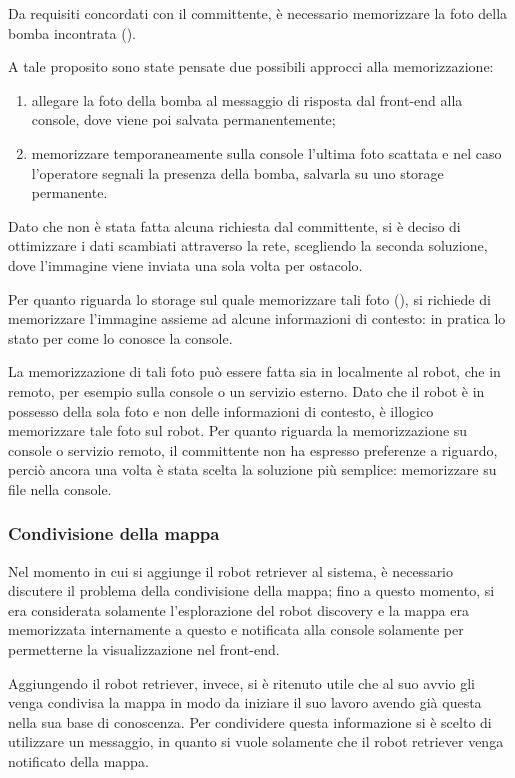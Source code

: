 Da requisiti concordati con il committente, è necessario memorizzare la foto della bomba incontrata ().

A tale proposito sono state pensate due possibili approcci alla memorizzazione:

\begin{enumerate}
  \item allegare la foto della bomba al messaggio di risposta dal front-end alla console, dove viene poi salvata permanentemente;
  \item memorizzare temporaneamente sulla console l'ultima foto scattata e nel caso l'operatore segnali la presenza della bomba, salvarla su uno storage permanente.
\end{enumerate}

Dato che non è stata fatta alcuna richiesta dal committente, si è deciso di ottimizzare i dati scambiati attraverso la rete, scegliendo la seconda soluzione, dove l'immagine viene inviata una sola volta per ostacolo.

Per quanto riguarda lo storage sul quale memorizzare tali foto (), si richiede di memorizzare l'immagine assieme ad alcune informazioni di contesto:
in pratica lo stato per come lo conosce la console.

La memorizzazione di tali foto può essere fatta sia in localmente al robot, che in remoto, per esempio sulla console o un servizio esterno.
Dato che il robot è in possesso della sola foto e non delle informazioni di contesto, è illogico memorizzare tale foto sul robot.
Per quanto riguarda la memorizzazione su console o servizio remoto, il committente non ha espresso preferenze a riguardo, perciò ancora una volta è stata scelta la soluzione più semplice:
memorizzare su file nella console.

\subsubsection{Condivisione della mappa}

Nel momento in cui si aggiunge il robot retriever al sistema, è necessario discutere il problema della condivisione della mappa;
fino a questo momento, si era considerata solamente l'esplorazione del robot discovery e la mappa era memorizzata internamente a questo e notificata alla console solamente per permetterne la visualizzazione nel front-end.

Aggiungendo il robot retriever, invece, si è ritenuto utile che al suo avvio gli venga condivisa la mappa in modo da iniziare il suo lavoro avendo già questa nella sua base di conoscenza.
Per condividere questa informazione si è scelto di utilizzare un messaggio, in quanto si vuole solamente che il robot retriever venga notificato della mappa.

